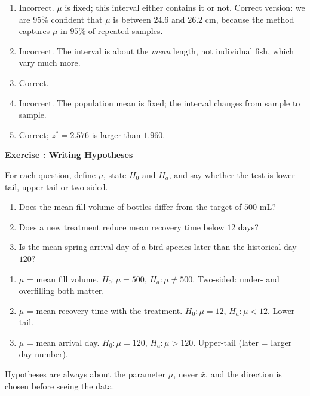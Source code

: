\documentclass[11pt]{article}
\newcounter{exercise}
\newcommand{\exercise}[1]{%
  \par\medskip
  \refstepcounter{exercise}%
  {\large\bfseries\color{CourseBlue} Exercise \theexercise: #1}\par\smallskip}
\begin{document}
\begin{solution}
\begin{enumerate}
  \item Incorrect. $\mu$ is fixed; this interval either contains it or not. Correct version: we are $95\%$ confident that $\mu$ is between $24.6$ and $26.2$ cm, because the method captures $\mu$ in $95\%$ of repeated samples.
  \item Incorrect. The interval is about the \emph{mean} length, not individual fish, which vary much more.
  \item Correct.
  \item Incorrect. The population mean is fixed; the interval changes from sample to sample.
  \item Correct; $z^*=2.576$ is larger than $1.960$.
\end{enumerate}
\end{solution}

\exercise{Writing Hypotheses}

For each question, define $\mu$, state $H_0$ and $H_a$, and say whether the test is lower-tail, upper-tail or two-sided.

\begin{enumerate}
  \item Does the mean fill volume of bottles differ from the target of $500$ mL?
  \item Does a new treatment reduce mean recovery time below $12$ days?
  \item Is the mean spring-arrival day of a bird species later than the historical day $120$?
\end{enumerate}

\begin{solution}
\begin{enumerate}
  \item $\mu$ = mean fill volume. $H_0:\mu=500$, $H_a:\mu\neq500$. Two-sided: under- and overfilling both matter.
  \item $\mu$ = mean recovery time with the treatment. $H_0:\mu=12$, $H_a:\mu<12$. Lower-tail.
  \item $\mu$ = mean arrival day. $H_0:\mu=120$, $H_a:\mu>120$. Upper-tail (later = larger day number).
\end{enumerate}
Hypotheses are always about the parameter $\mu$, never $\bar x$, and the direction is chosen before seeing the data.
\end{solution}
\end{document}
